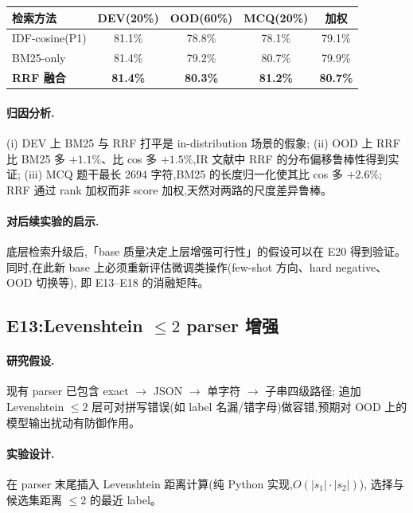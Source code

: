 \documentclass[11pt,a4paper]{ctexart}
\begin{document}
\begin{table}[h]
\centering
\small
\begin{tabular}{lcccc}
\toprule
检索方法 & DEV(20\%) & OOD(60\%) & MCQ(20\%) & 加权 \\
\midrule
IDF-cosine(P1)    & 81.1\% & 78.8\% & 78.1\% & 79.1\% \\
BM25-only         & 81.4\% & 79.2\% & 80.7\% & 79.9\% \\
\textbf{RRF 融合} & \textbf{81.4\%} & \textbf{80.3\%} & \textbf{81.2\%} & \textbf{80.7\%} \\
\bottomrule
\end{tabular}
\end{table}

\paragraph{归因分析.}
(i) DEV 上 BM25 与 RRF 打平是 in-distribution 场景的假象;
(ii) OOD 上 RRF 比 BM25 多 $+1.1\%$、比 cos 多 $+1.5\%$,IR 文献中 RRF 的分布偏移鲁棒性得到实证;
(iii) MCQ 题干最长 2694 字符,BM25 的长度归一化使其比 cos 多 $+2.6\%$;
RRF 通过 rank 加权而非 score 加权,天然对两路的尺度差异鲁棒。

\paragraph{对后续实验的启示.}底层检索升级后,「base 质量决定上层增强可行性」的假设可以在 E20 得到验证。
同时,在此新 base 上必须重新评估微调类操作(few-shot 方向、hard negative、OOD 切换等),
即 E13--E18 的消融矩阵。

\subsection{E13:Levenshtein $\le 2$ parser 增强}

\paragraph{研究假设.}现有 parser 已包含 exact $\to$ JSON $\to$ 单字符 $\to$ 子串四级路径;
追加 Levenshtein $\le 2$ 层可对拼写错误(如 label 名漏/错字母)做容错,预期对 OOD 上的模型输出扰动有防御作用。

\paragraph{实验设计.}在 parser 末尾插入 Levenshtein 距离计算(纯 Python 实现,$O(|s_1|\cdot|s_2|)$),
选择与候选集距离 $\le 2$ 的最近 label。
\end{document}
